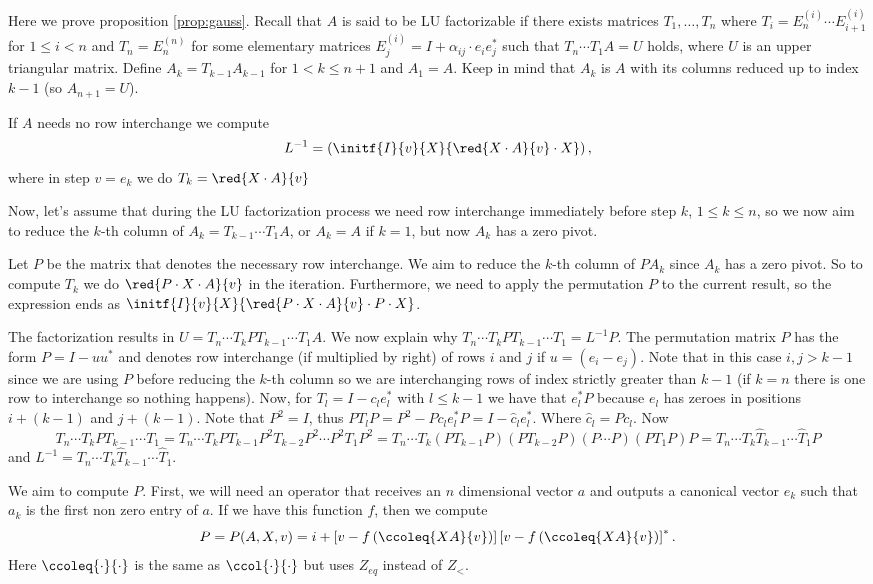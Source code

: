 Here we prove proposition \ref{prop:gauss}. Recall that $A$ is said to be LU factorizable if there exists matrices $T_1,\ldots, T_{n}$ where $T_i=E_{n}^{(i)}\cdots E_{i+1}^{(i)}$ for $1\leq i < n$ and $T_n=E^{(n)}_n$ for some elementary matrices $E_{j}^{(i)}=I+\alpha_{ij}\cdot e_{i}e_{j}^{*}$ such that $T_{n}\cdots T_1A=U$ holds, where $U$ is an upper triangular matrix. Define $A_k=T_{k-1}A_{k-1}$ for $1< k\leq n+1$ and $A_1=A$. Keep in mind that $A_k$ is $A$ with its columns reduced up to index $k-1$ (so $A_{n+1}=U$). 

If $A$ needs no row interchange we compute $$L^{-1}=\left( \initf{I}{v}{X}{\red{X\cdot A}{v}\cdot X} \right),$$ where in step $v=e_k$ we do $T_k=\red{X\cdot A}{v}$ 


Now, let's assume that during the LU factorization process we need row interchange immediately before step $k$, $1\leq k\leq n$, so we now aim to reduce the $k$-th column of $A_k=T_{k-1}\cdots T_1A$, or $A_k=A$ if $k=1$, but now $A_k$ has a zero pivot. 

Let $P$ be the matrix that denotes the necessary row interchange. We aim to reduce the $k$-th column of $PA_{k}$ since $A_{k}$ has a zero pivot. So to compute $T_k$ we do $\red{P\cdot X\cdot A}{v}$ in the iteration. Furthermore, we need to apply the permutation $P$ to the current result, so the expression ends as $\initf{I}{v}{X}{\red{P\cdot X\cdot A}{v}\cdot P\cdot X}$.

The factorization results in $U=T_{n}\cdots T_kPT_{k-1}\cdots T_1A$. We now explain why $T_{n}\cdots T_kPT_{k-1}\cdots T_1 = L^{-1}P.$ The permutation matrix $P$ has the form $P = I - uu^*$ and denotes row interchange (if multiplied by right) of rows $i$ and $j$ if $u=(e_{i}-e_{j})$. Note that in this case $i,j>k-1$ since we are using $P$ before reducing the $k$-th column so we are interchanging rows of index strictly greater than $k-1$ (if $k=n$ there is one row to interchange so nothing happens). Now, for $T_{l}=I-c_le_l^*$ with $l\leq k-1$ we have that $e_l^*P$ because $e_l$ has zeroes in positions $i+(k-1)$ and $j+(k-1)$. Note that $P^2=I$, thus $PT_lP=P^2-Pc_le_l^*P=I-\widehat{c}_le_l^*.$ Where $\widehat{c}_l=Pc_l$. Now $$T_{n}\cdots T_kPT_{k-1}\cdots T_1=T_{n}\cdots T_kPT_{k-1}P^2T_{k-2}P^2\cdots P^2 T_1P^2=T_{n}\cdots T_k(PT_{k-1}P)(PT_{k-2}P)(P\cdots P)(PT_1P)P=T_{n}\cdots T_k\widehat{T}_{k-1}\cdots \widehat{T}_1P$$ and $L^{-1} = T_{n}\cdots T_k\widehat{T}_{k-1}\cdots \widehat{T}_1$.

We aim to compute $P$. First, we will need an operator that receives an $n$ dimensional vector $a$ and outputs a canonical vector $e_k$ such that $a_k$ is the first non zero entry of $a$. If we have this function $f$, then we compute $$P=P(A,X,v) = i + \left[ v - f\left( \ccoleq{XA}{v} \right) \right]\left[ v - f\left( \ccoleq{XA}{v} \right) \right]^*.$$ Here $\ccoleq{\cdot}{\cdot}$ is the same as $\ccol{\cdot}{\cdot}$ but uses $Z_{eq}$ instead of $Z_{<}$.

